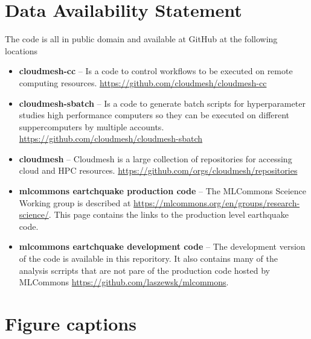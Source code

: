\documentclass[utf8]{FrontiersinVancouver} %
\begin{document}
\section*{Data Availability Statement}

The code is all in public domain and available at GitHub at the following locations

\begin{itemize}

\item {\bf cloudmesh-cc} -- Is a code to control workflows to be executed on
  remote computing
  resources. \url{https://github.com/cloudmesh/cloudmesh-cc}

\item {\bf cloudmesh-sbatch} -- Is a code to generate batch scripts for
  hyperparameter studies high performance computers so they can be
  executed on different suppercomputers by multiple
  accounts. \url{https://github.com/cloudmesh/cloudmesh-sbatch}

\item {\bf cloudmesh} -- Cloudmesh is a large collection of repositories for
  accessing cloud and HPC
  resources. \url{https://github.com/orgs/cloudmesh/repositories}

\item {\bf mlcommons eartchquake production code} -- The MLCommons Sceience
  Working group is described at
  \url{https://mlcommons.org/en/groups/research-science/}. This page
  contains the links to the production level earthquake code.

\item {\bf mlcommons eartchquake development code} -- The development version of
  the code is available in this reporitory. It also contains many of
  the analysis scrripts that are not pare of the production code
  hosted by MLCommons \url{https://github.com/laszewsk/mlcommons}.
  
\end{itemize}


% 





\section*{Figure captions}
\end{document}
